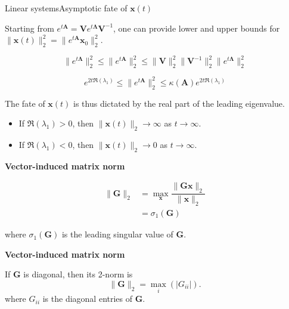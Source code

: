 \documentclass[usenames,dvipsnames,svgnames,10pt,aspectratio=169]{beamer}
\begin{document}
\begin{frame}[t, c]{Linear systems}{Asymptotic fate of $\bm{x}(t)$}
  \begin{minipage}{.58\textwidth}

    Starting from $e^{t \bm{A}} = \bm{V} e^{t \boldsymbol{\Lambda}} \bm{V}^{-1}$, one can provide lower and upper bounds for $\| \bm{x}(t) \|_2^2 = \| e^{t \bm{A}} \bm{x}_0 \|_2^2$.

    \begin{overprint}

      \medskip

      \[
      \| e^{t \boldsymbol{\Lambda}} \|_2^2 \leq \| e^{t \bm{A}} \|_2^2 \leq \| \bm{V} \|_2^2 \| \bm{V}^{-1} \|_2^2 \| e^{t \boldsymbol{\Lambda}} \|_2^2
      \]

      \bigskip


      \medskip

      \[
      e^{2 t \Re(\lambda_1)} \leq \| e^{t \bm{A}} \|_2^2 \leq \kappa(\bm{A}) e^{2 t \Re(\lambda_1)}
      \]

      \bigskip

      The fate of $\bm{x}(t)$ is thus dictated by the real part of the leading eigenvalue.

      \begin{itemize}
      \item If $\Re(\lambda_1) > 0$, then $\| \bm{x}(t) \|_2 \to \infty$ as $t \to \infty$.
      \item If $\Re(\lambda_1) < 0$, then $\| \bm{x}(t) \|_2 \to 0$ as $t \to \infty$.
      \end{itemize}
    \end{overprint}
  \end{minipage}%
  \hfill
  \begin{minipage}{.38\textwidth}
    \begin{overprint}
      \begin{center}
        \textbf{Vector-induced matrix norm}
      \end{center}
      \[
      \begin{aligned}
        \| \bm{G} \|_2 & = \max_{\bm{x}} \dfrac{\| \bm{Gx} \|_2}{\| \bm{x} \|_2} \\
        & = \sigma_1(\bm{G})
      \end{aligned}
      \]
      
      where $\sigma_1(\bm{G})$ is the leading singular value of $\bm{G}$.

      \begin{center}
        \textbf{Vector-induced matrix norm}
      \end{center}

      If $\bm{G}$ is diagonal, then its 2-norm is
      \[
      \| \bm{G} \|_2 = \max_i (\vert G_{ii} \vert).
      \]
      where $G_{ii}$ is the diagonal entries of $\bm{G}$.

\end{overprint}
  \end{minipage}
    
  \vspace{1cm}
\end{frame}
\end{document}
